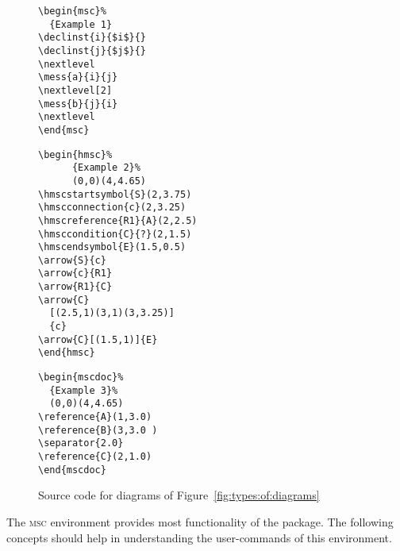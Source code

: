 \documentclass[a4paper]{article}
\newcommand{\acro}[1]{{\scshape\lowercase{#1}}}
\newcommand\MSC{\acro{MSC}}
\begin{document}
\begin{figure}[htb]
\hrulefill
\begin{center}
\begin{minipage}[t]{0.3\linewidth}
\small
\begin{verbatim}
\begin{msc}%
  {Example 1}
\declinst{i}{$i$}{}
\declinst{j}{$j$}{}
\nextlevel
\mess{a}{i}{j}
\nextlevel[2]
\mess{b}{j}{i}
\nextlevel
\end{msc}
\end{verbatim}
\end{minipage}
\hfil
\begin{minipage}[t]{0.3\linewidth}
\small
\begin{verbatim}
\begin{hmsc}%
      {Example 2}%
      (0,0)(4,4.65)
\hmscstartsymbol{S}(2,3.75)
\hmscconnection{c}(2,3.25)
\hmscreference{R1}{A}(2,2.5)
\hmsccondition{C}{?}(2,1.5)
\hmscendsymbol{E}(1.5,0.5)
\arrow{S}{c}
\arrow{c}{R1}
\arrow{R1}{C}
\arrow{C}
  [(2.5,1)(3,1)(3,3.25)]
  {c}
\arrow{C}[(1.5,1)]{E}
\end{hmsc}
\end{verbatim}
\end{minipage}
\hfil
\begin{minipage}[t]{0.3\linewidth}
\small
\begin{verbatim}
\begin{mscdoc}%
  {Example 3}%
  (0,0)(4,4.65)
\reference{A}(1,3.0)
\reference{B}(3,3.0 )
\separator{2.0}
\reference{C}(2,1.0)
\end{mscdoc}
\end{verbatim}
\end{minipage}
\end{center}
\hrulefill
\caption{Source code for diagrams of Figure~\ref{fig:types:of:diagrams}}
\label{fig:sources}
\end{figure}


The \MSC{} environment provides most functionality of the package. The
following concepts should help in understanding the user-commands of
this environment.
\end{document}
